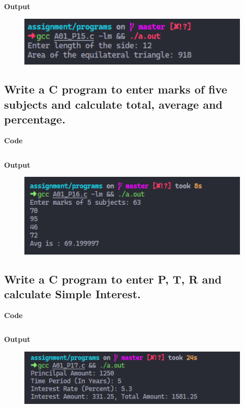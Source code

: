 \documentclass[a4paper]{article}
\begin{document}
\inputminted{C}{programs/A01_P15.c}

\textbf{Output}

\begin{figure}[h]
  \includegraphics[width=12cm]{A01_P15}
\end{figure}

\newpage



\subsection{Write a C program to enter marks of five subjects and calculate total, average and percentage.}
\textbf{Code}

\inputminted{C}{programs/A01_P16.c}

\textbf{Output}

\begin{figure}[h]
  \includegraphics[width=12cm]{A01_P16}
\end{figure}

\newpage



\subsection{Write a C program to enter P, T, R and calculate Simple Interest.}
\textbf{Code}

\inputminted{C}{programs/A01_P17.c}

\textbf{Output}

\begin{figure}[h]
  \includegraphics[width=12cm]{A01_P17}
\end{figure}
\end{document}
